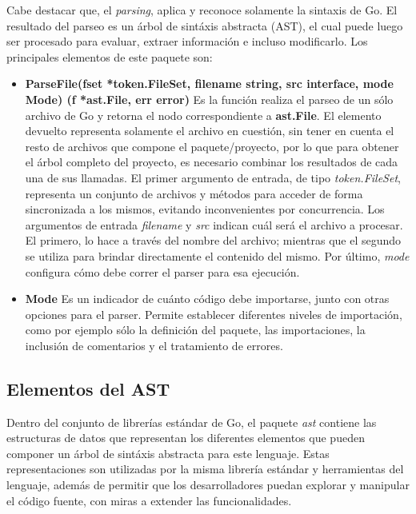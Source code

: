 \begin{itemize}
  Cabe destacar que, el \textit{parsing}, aplica y reconoce solamente la sintaxis de Go.
  El resultado del parseo es un árbol de sintáxis abstracta (AST), el cual puede luego ser procesado 
  para evaluar, extraer información e incluso modificarlo.
  Los principales elementos de este paquete son:
  \begin{itemize}
    \item \textbf{ParseFile(fset *token.FileSet, filename string, src interface{}, mode Mode) (f *ast.File, err error)} 
    Es la función realiza el parseo de un sólo archivo de Go y retorna el nodo correspondiente a \textbf{ast.File}.
    El elemento devuelto representa solamente el archivo en cuestión, sin tener en cuenta el resto de 
    archivos que compone el paquete/proyecto, por lo que para obtener el árbol completo del proyecto, 
    es necesario combinar los resultados de cada una de sus llamadas.
    El primer argumento de entrada, de tipo \textit{token.FileSet}, representa un conjunto de archivos 
    y métodos para acceder de forma sincronizada a los mismos, evitando inconvenientes por concurrencia.
    Los argumentos de entrada \textit{filename} y \textit{src} indican cuál será el archivo a procesar.
    El primero, lo hace a través del nombre del archivo; mientras que el segundo se utiliza para brindar 
    directamente el contenido del mismo.
    Por último, \textit{mode} configura cómo debe correr el parser para esa ejecución.
    \item \textbf{Mode} Es un indicador de cuánto código debe importarse, junto con otras opciones para el parser.
    Permite establecer diferentes niveles de importación, como por ejemplo sólo la definición del paquete, 
    las importaciones, la inclusión de comentarios y el tratamiento de errores.
  \end{itemize}
\end{itemize}

\subsection{Elementos del AST}

Dentro del conjunto de librerías estándar de Go, el paquete \textit{ast} contiene
las estructuras de datos que representan los diferentes elementos que pueden componer un árbol de
sintáxis abstracta para este lenguaje.
Estas representaciones son utilizadas por la misma librería estándar y herramientas del lenguaje,
además de permitir que los desarrolladores puedan explorar y manipular el código fuente, con miras
a extender las funcionalidades.

